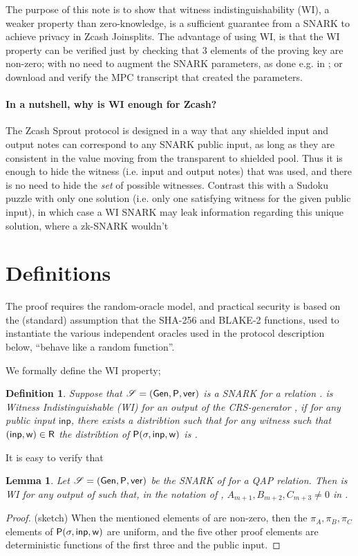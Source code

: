 \documentclass[11pt]{article}
\numberwithin{equation}{section} %
\numberwithin{figure}{section} %
\newtheorem{dfn}[thm]{Definition}
\newtheorem{lemma}[thm]{Lemma}
\newcommand{\inp}{\ensuremath{\mathsf{inp}}\xspace}
\begin{document}
The purpose of this note is to show that witness indistinguishability (WI), a weaker property than zero-knowledge, is a sufficient guarantee from a SNARK to achieve privacy in Zcash Joinsplits.
The advantage of using WI, is that the WI property can be verified just by checking that 3 elements of the \cite{vnSNARK} proving key are non-zero;
with no need to augment the SNARK parameters, as done e.g. in \cite{F17}; or download and verify the MPC transcript that created the parameters.

\paragraph{In a nutshell, why is WI enough for Zcash?}
The Zcash Sprout protocol is designed in a way that any shielded input and output notes can correspond to any SNARK public input, as long as they are consistent in the value moving from the transparent to shielded pool.
Thus it is enough to hide the witness (i.e. input and output notes) that was used, and there is no need to hide the \emph{set} of possible witnesses.
Contrast this with a Sudoku puzzle with only one solution (i.e. only one satisfying witness for the given public input), in which case a WI
SNARK may leak information regarding this unique solution, where a zk-SNARK wouldn't

\section{Definitions}


The proof requires the random-oracle model, and practical security is based on the (standard) assumption that the SHA-256 and BLAKE-2 functions,
used to instantiate the various independent oracles used in the protocol description below, ``behave like a random function''.

We formally define the WI property;
\begin{dfn}
Suppose that $\mathscr S = (\mathsf{Gen},\mathsf{P},\mathsf{ver})$ is a SNARK for a relation \rel.
\snark is \emph{Witness Indistinguishable} (WI) for an output \crs of the CRS-generator \gen, if for any public input \inp, there exists a distribtion \dist such that for any witness \wit such that $(\inp,\wit)\in \rel$ the distribtion of $\prv(\crs,\inp,\wit)$ is \dist.
\end{dfn}
It is easy to verify that 
\begin{lemma}\label{lem:BCTV_is_WI}
Let $\mathscr S= (\mathsf{Gen},\mathsf{P},\mathsf{ver})$ be the SNARK of \cite{vnSNARK} for a QAP relation.
Then \snark is WI for any output \crs of \gen such that, in the notation of \cite{vnSNARK}, 
 $A_{m+1},B_{m+2},C_{m+3}\neq 0$ in \crs.
\end{lemma}
\begin{proof}(sketch)
When the mentioned elements of \crs are non-zero, then the $\pi_A,\pi_B,\pi_C$ elements of $\prv(\crs,\inp,\wit)$ are uniform,
and the five other proof elements are deterministic functions of the first three and the public input.
\end{proof}
\end{document}
